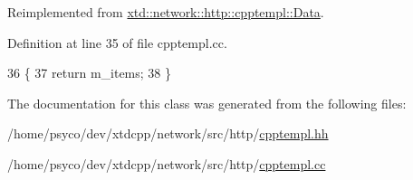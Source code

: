Reimplemented from \hyperlink{classxtd_1_1network_1_1http_1_1cpptempl_1_1Data_abb82f257b867cd0da2469cc6c5ecdbae}{xtd\+::network\+::http\+::cpptempl\+::\+Data}.



Definition at line 35 of file cpptempl.\+cc.


\begin{DoxyCode}
36 \{
37   \textcolor{keywordflow}{return} m\_items;
38 \}
\end{DoxyCode}


The documentation for this class was generated from the following files\+:\begin{DoxyCompactItemize}
\item 
/home/psyco/dev/xtdcpp/network/src/http/\hyperlink{cpptempl_8hh}{cpptempl.\+hh}\item 
/home/psyco/dev/xtdcpp/network/src/http/\hyperlink{cpptempl_8cc}{cpptempl.\+cc}\end{DoxyCompactItemize}
